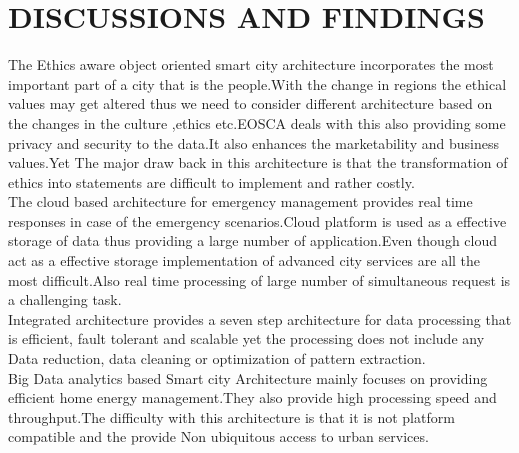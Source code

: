 \documentclass[10pt,a4paper,journal]{IEEEtran}
\begin{document}
\section{DISCUSSIONS AND FINDINGS}
\hspace{2em}The Ethics aware object oriented smart city architecture\cite{3} incorporates the most important part of a city that is the people.With the change in regions the ethical values may get altered thus we need to consider different architecture based on the changes in the culture ,ethics etc.EOSCA deals with this also providing some privacy and security to the data.It also enhances the marketability and business values.Yet The major draw back in this architecture is that the transformation of ethics into statements are difficult to implement and rather costly.\\
\hspace{2em}The cloud based architecture for emergency management\cite{7} provides real time responses in case of the emergency scenarios.Cloud platform is used as a effective storage of data thus providing a large number of application.Even though cloud act as a effective storage implementation of advanced city services are all the most difficult.Also real time processing of large number of simultaneous request is a challenging task.\\
\hspace{2em}Integrated architecture \cite{8} provides a seven step architecture for data processing that is efficient, fault tolerant and scalable yet the processing does not include any Data reduction, data cleaning or optimization of pattern extraction.\\
\hspace{2em}Big Data analytics based Smart city Architecture\cite{9} mainly focuses on providing  efficient home energy management.They also provide high processing speed and throughput.The difficulty with this architecture is that it is not platform compatible and the provide Non ubiquitous access to urban services.\\
\end{document}
